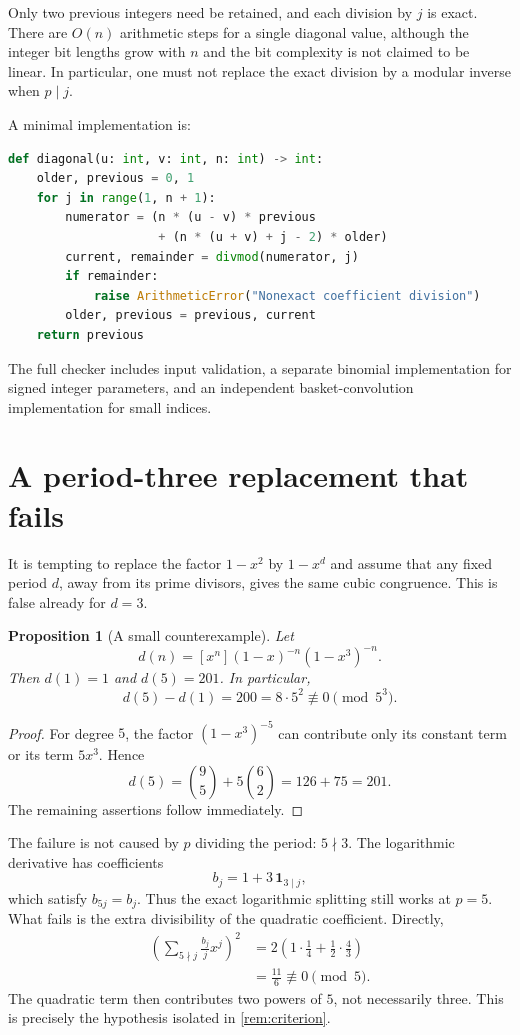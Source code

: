 \documentclass[11pt,a4paper]{article}
\numberwithin{equation}{section}
\newtheorem{proposition}[proposition]{Proposition}
\theoremstyle{definition}
\theoremstyle{remark}
\begin{document}
Only two previous integers need be retained, and each division by $j$
is exact. There are $O(n)$ arithmetic steps for a single diagonal value,
although the integer bit lengths grow with $n$ and the bit complexity
is not claimed to be linear. In particular, one must not replace the
exact division by a modular inverse when $p\mid j$.

A minimal implementation is:
\begin{lstlisting}[language=Python]
def diagonal(u: int, v: int, n: int) -> int:
    older, previous = 0, 1
    for j in range(1, n + 1):
        numerator = (n * (u - v) * previous
                     + (n * (u + v) + j - 2) * older)
        current, remainder = divmod(numerator, j)
        if remainder:
            raise ArithmeticError("Nonexact coefficient division")
        older, previous = previous, current
    return previous
\end{lstlisting}
The full checker includes input validation, a separate binomial
implementation for signed integer parameters, and an independent
basket-convolution implementation for small indices.

\section{A period-three replacement that fails}\label{sec:boundary}

It is tempting to replace the factor $1-x^2$ by $1-x^d$ and assume that
any fixed period $d$, away from its prime divisors, gives the same cubic
congruence. This is false already for $d=3$.

\begin{proposition}[A small counterexample]\label{prop:counterexample}
Let
\[
 d(n)=[x^n](1-x)^{-n}(1-x^3)^{-n}.
\]
Then $d(1)=1$ and $d(5)=201$. In particular,
\[
 d(5)-d(1)=200=8\cdot5^2\not\equiv0\pmod{5^3}.
\]
\end{proposition}
\begin{proof}
For degree $5$, the factor $(1-x^3)^{-5}$ can contribute only its
constant term or its term $5x^3$. Hence
\[
 d(5)=\binom95+5\binom62=126+75=201.
\]
The remaining assertions follow immediately.
\end{proof}

The failure is not caused by $p$ dividing the period: $5\nmid3$.
The logarithmic derivative has coefficients
\[
 b_j=1+3\,\mathbf1_{3\mid j},
\]
which satisfy $b_{5j}=b_j$. Thus the exact logarithmic splitting still
works at $p=5$. What fails is the extra divisibility of the quadratic
coefficient. Directly,
\begin{align*}
 [x^5]\left(\sum_{5\nmid j}\frac{b_j}{j}x^j\right)^2
 &=2\left(1\cdot\frac14+\frac12\cdot\frac43\right)\\
 &=\frac{11}{6}\not\equiv0\pmod5.
\end{align*}
The quadratic term then contributes two powers of $5$, not necessarily
three. This is precisely the hypothesis isolated in
\cref{rem:criterion}.
\end{document}
